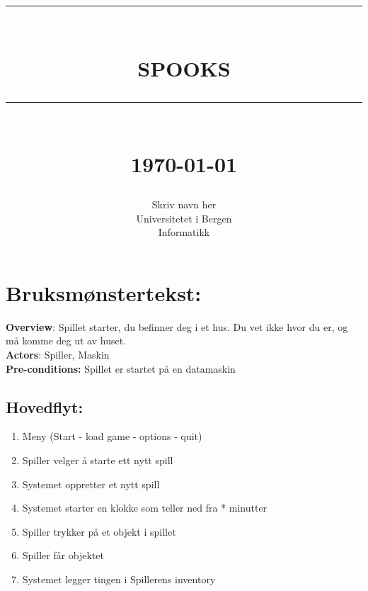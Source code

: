 \documentclass[12pt]{report}
\newcommand{\HRule}[1]{\rule{\linewidth}{#1}}
\begin{document}
\title{ \normalsize \textsc{}
		\\ [2.0cm]
		\HRule{0.5pt} \\
		\LARGE \textbf{\uppercase{Spooks}}
		\HRule{2pt} \\ [0.5cm]
		\normalsize \today \vspace*{5\baselineskip}}

\date{}

\author{
		Skriv navn her  \\ 
		Universitetet i Bergen \\
		Informatikk }

\maketitle
\tableofcontents
\newpage

\sectionfont{\scshape}


\section*{Bruksm{\o}nstertekst:}

\textbf{Overview}: Spillet starter, du befinner deg i et hus. Du vet ikke hvor du er,
og m{\aa} komme deg ut av huset. 
\bigskip \\
\textbf{Actors}: Spiller, Maskin 
\bigskip \\
\textbf{Pre-conditions:} Spillet er startet p{\aa} en datamaskin

\subsection*{Hovedflyt:}

\begin{enumerate}
\item Meny (Start - load game - options - quit)
\item Spiller velger {\aa} starte ett nytt spill
\item Systemet oppretter et nytt spill
\item Systemet starter en klokke som teller ned fra * minutter
\item Spiller trykker p{\aa} et objekt i spillet
\item Spiller f{\aa}r objektet
\item Systemet legger tingen i Spillerens inventory
\end{enumerate}
\end{document}

